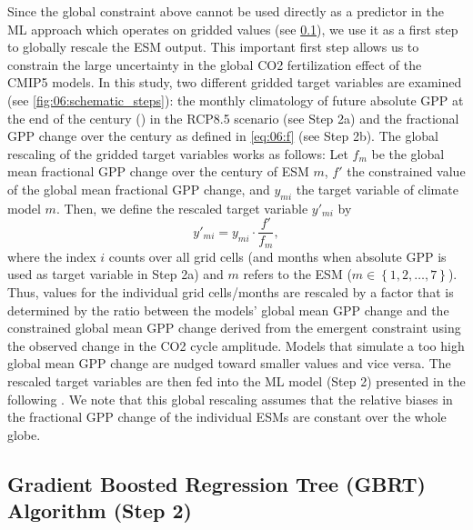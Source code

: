 Since the global constraint above cannot be used directly as a predictor in the
\ac{ML} approach which operates on gridded values (see
\cref{subsec:06:step_2}), we use it as a first step to globally rescale the
\ac{ESM} output. This important first step allows us to constrain the large
uncertainty in the global \ac{CO2} fertilization effect of the \acs{CMIP}5
models. In this study, two different gridded target variables are examined (see
\cref{fig:06:schematic_steps}): the monthly climatology of future absolute
\ac{GPP} at the end of the  century () in the
\acs{RCP}8.5 scenario (see Step 2a) and the fractional \acs{GPP} change over
the  century as defined in \cref{eq:06:f} (see Step 2b). The global
rescaling of the gridded target variables works as follows: Let $f_m$ be the
global mean fractional \acs{GPP} change over the  century of \ac{ESM}
$m$, $f'$ the constrained value of the global mean fractional \ac{GPP} change,
and $y_{mi}$ the target variable of climate model $m$. Then, we define the
rescaled target variable $y'_{mi}$ by
\begin{equation}
  y'_{mi} = y_{mi} \cdot \frac{f'}{f_m},
  \label{eq:06:y}
\end{equation}
where the index $i$ counts over all grid cells (and months when absolute
\ac{GPP} is used as target variable in Step 2a) and $m$ refers to the \ac{ESM}
($m \in \left\{ 1, 2, \ldots, 7 \right\}$). Thus, values for the individual
grid cells/months are rescaled by a factor that is determined by the ratio
between the models' global mean \ac{GPP} change and the constrained global mean
\ac{GPP} change derived from the \textcite{Wenzel2016} emergent constraint
using the observed change in the \ac{CO2} cycle amplitude. Models that simulate
a too high global mean \ac{GPP} change are nudged toward smaller values and
vice versa. The rescaled target variables are then fed into the \ac{ML} model
(Step 2) presented in the following . We note that
this global rescaling assumes that the relative biases in the fractional
\ac{GPP} change of the individual \acp{ESM} are constant over the whole globe.


\subsection{Gradient Boosted Regression Tree (\acs{GBRT}) Algorithm (Step 2)}
\label{subsec:06:step_2}

